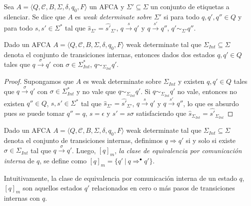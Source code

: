 \begin{definition}
Sea $A= \langle Q, \mathcal{C}, B, \Sigma, \delta, q_0, F \rangle$ un AFCA y $\Sigma' \subseteq \Sigma$ un conjunto de etiquetas a silenciar. Se dice que $A$ es \emph{weak determinate sobre $\Sigma'$} si para todo $q, q', q'' \in Q$ y para todo $s, s' \in \Sigma^*$ tal que $\widehat{s}_{\Sigma'} = \widehat{s'}_{\Sigma'}$, $q \xrightarrow{s} q'$ y $q \xrightarrow{s'} q''$, $q' \sim_{\Sigma'} q''$.
\end{definition}

\begin{prop}
Dado un AFCA $A = \langle Q, \mathcal{C}, B, \Sigma, \delta, q_0, F \rangle$ weak determinate tal que $\Sigma_\mathit{Int} \subseteq \Sigma$ denota el conjunto de transiciones internas, entonces dados dos estados $q, q' \in Q$ tales que $q \xrightarrow{\sigma} q'$ con $\sigma \in \Sigma_{\mathit{Int}}^*$,  $q \sim_{\Sigma_\mathit{Int}} q'$.
\end{prop}
\begin{proof}
Supongamos que $A$ es weak determinate sobre $\Sigma_\mathit{Int}$ y existen $q, q' \in Q$ tales que $q \xrightarrow{\sigma} q'$ con $\sigma \in \Sigma_{\mathit{Int}}^*$ y no vale que $q \sim_{\Sigma_\mathit{Int}} q'$. Si $q \sim_{\Sigma_\mathit{Int}} q'$ no vale, entonces no existen $q'' \in Q$,  $s, s' \in \Sigma^*$ tal que $\widehat{s}_{\Sigma'} = \widehat{s'}_{\Sigma'}$, $q \xrightarrow{s} q'$ y $q \xrightarrow{s'} q''$, lo que es absurdo pues se puede tomar $q'' = q$, $s = \epsilon$ y $s' = s\sigma$ satisfaciendo que $\widehat{s}_{\Sigma_\mathit{Int}} = \widehat{s'}_{\Sigma_\mathit{Int}}$
\end{proof}


\begin{definition} \label{def:eci}
Dado un AFCA $A = \langle Q, \mathcal{C}, B, \Sigma, \delta, q_0, F \rangle$ weak determinate tal que $\Sigma_\mathit{Int} \subseteq \Sigma$ denota el conjunto de transiciones internas, definimos $q \Rightarrow q'$ si y solo si existe $\sigma \in \Sigma_\mathit{Int}$ tal que $q \xrightarrow{\sigma} q'$. Luego, $[q]_m$, \emph{la clase de equivalencia por comunicación interna} de $q$, se define como $[q]_m = \{q'\ |\ q \Rightarrow^\bullet q'\}$. 
\end{definition}

Intuitivamente, la clase de equivalencia por comunicación interna de un estado $q$, $[q]_m$ son aquellos estados $q'$ relacionados en cero o más pasos de transiciones internas con $q$.

